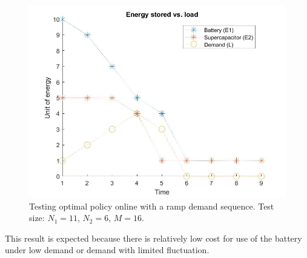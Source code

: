 \documentclass[conference]{IEEEtran}
\begin{document}
\begin{figure}[htbp]
\centerline{\includegraphics[scale=0.25]{EnergyStoredvsload_RampLoad(E1_max=10,E2_max=5).jpg}}
\caption{Testing optimal policy online with a ramp demand sequence. Test size: $N_{1}=11$, $N_{2}=6$, $M=16$.}
\label{fig:RampDemand}
\end{figure} This result is expected because there is relatively low cost for use of the battery under low demand or demand with limited fluctuation.
\end{document}

